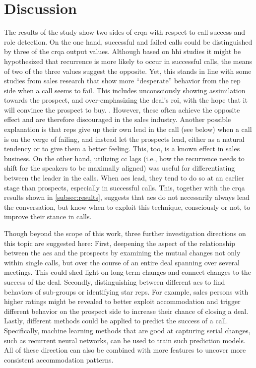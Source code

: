 \section{Discussion}
\label{sec:discussion_hhi}

The results of the study show two sides of \ac{crqa} with respect to call success and role detection.
On the one hand, successful and failed calls could be distinguished by three of the \ac{crqa} output values.
Although based on \ac{hhi} studies it might be hypothesized that recurrence is more likely to occur in successful calls, the means of two of the three values suggest the opposite.
Yet, this stands in line with some studies from sales research that show more \enquote{desperate} behavior from the rep side when a call seems to fail.
This includes unconsciously showing assimilation towards the prospect, and over-emphasizing the deal's \ac{roi}, with the hope that it will convince the prospect to buy. \citep{Orlob2018roi}.
However, these often achieve the opposite effect and are therefore discouraged in the sales industry.
Another possible explanation is that reps give up their own lead in the call (see below) when a call is on the verge of failing, and instead let the prospects lead, either as a natural tendency or to give them a better feeling.
This, too, is a known effect in sales business.
On the other hand, utilizing \acl{cc} lags (i.e., how the recurrence needs to shift for the speakers to be maximally aligned) was useful for differentiating between the leader in the calls.
When \acp{ae} lead, they tend to do so at an earlier stage than prospects, especially in successful calls.
This, together with the \ac{crqa} results shown in \cref{subsec:results}, suggests that \acp{ae} do not necessarily always lead the conversation, but know when to exploit this technique, consciously or not, to improve their stance in calls.

Though beyond the scope of this work, three further investigation directions on this topic are suggested here:
First, deepening the aspect of the relationship between the \acp{ae} and the prospects by examining the mutual changes not only within single calls, but over the course of an entire deal spanning over several meetings.
This could shed light on long-term changes and connect changes to the success of the deal.
Secondly, distinguishing between different \acp{ae} to find behaviors of sub-groups or identifying star reps.
For example, sales persons with higher ratings might be revealed to better exploit accommodation and trigger different behavior on the prospect side to increase their chance of closing a deal.
Lastly, different methods could be applied to predict the success of a call.
Specifically, machine learning methods that are good at capturing serial changes, such as recurrent neural networks, can be used to train such prediction models.
All of these direction can also be combined with more features to uncover more consistent accommodation patterns.

